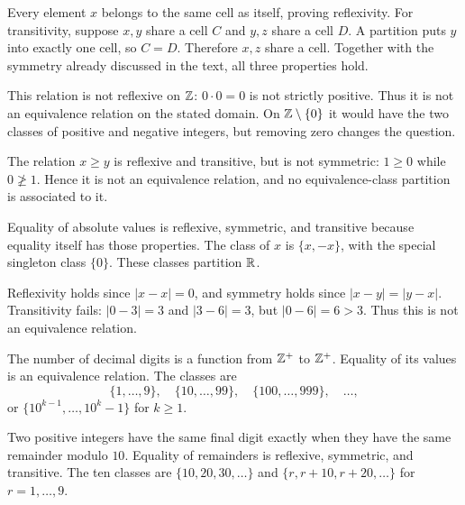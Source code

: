 
Every element $x$ belongs to the same cell as itself, proving reflexivity. For transitivity, suppose $x,y$ share a cell $C$ and $y,z$ share a cell $D$. A partition puts $y$ into exactly one cell, so $C=D$. Therefore $x,z$ share a cell. Together with the symmetry already discussed in the text, all three properties hold.


This relation is not reflexive on $\mathbb{Z}$: $0\cdot0=0$ is not strictly positive. Thus it is not an equivalence relation on the stated domain. On $\mathbb{Z}\setminus\{0\}$ it would have the two classes of positive and negative integers, but removing zero changes the question.


The relation $x\ge y$ is reflexive and transitive, but is not symmetric: $1\ge0$ while $0\not\ge1$. Hence it is not an equivalence relation, and no equivalence-class partition is associated to it.


Equality of absolute values is reflexive, symmetric, and transitive because equality itself has those properties. The class of $x$ is $\{x,-x\}$, with the special singleton class $\{0\}$. These classes partition $\mathbb{R}$.


Reflexivity holds since $|x-x|=0$, and symmetry holds since $|x-y|=|y-x|$. Transitivity fails: $|0-3|=3$ and $|3-6|=3$, but $|0-6|=6>3$. Thus this is not an equivalence relation.


The number of decimal digits is a function from $\mathbb{Z}^+$ to $\mathbb{Z}^+$. Equality of its values is an equivalence relation. The classes are
\[\{1,\ldots,9\},\quad\{10,\ldots,99\},\quad\{100,\ldots,999\},\quad\ldots,
\]
or $\{10^{k-1},\ldots,10^k-1\}$ for $k\ge1$.


Two positive integers have the same final digit exactly when they have the same remainder modulo $10$. Equality of remainders is reflexive, symmetric, and transitive. The ten classes are $\{10,20,30,\ldots\}$ and $\{r,r+10,r+20,\ldots\}$ for $r=1,\ldots,9$.


